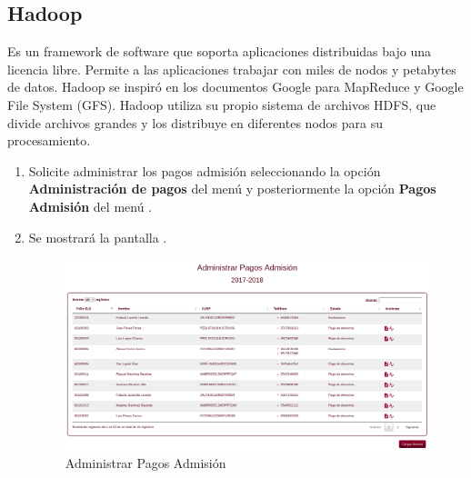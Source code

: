 \subsection{Hadoop}
Es un framework de software que soporta aplicaciones distribuidas bajo una licencia libre. Permite a las aplicaciones trabajar con miles de nodos y petabytes de datos. Hadoop se inspiró en los documentos Google para MapReduce y Google File System (GFS). Hadoop utiliza su propio sistema de archivos HDFS, que divide archivos grandes y los distribuye en diferentes nodos para su procesamiento.
\begin{enumerate}
	\item Solicite administrar los pagos admisión seleccionando la opción \textbf{Administración de pagos} del menú  y posteriormente la opción \textbf{Pagos Admisión} del menú .
	\item Se mostrará la pantalla .
	\begin{figure}[!htbp]
		\hypertarget{fig:APA}{\hspace{1pt}}
		\begin{center}
			\includegraphics[height=0.3\textheight]{capitulo1/images/IU-APA.png}
			\caption{Administrar Pagos Admisión}
			\label{fig:APA}
		\end{center}
	\end{figure}

	
\end{enumerate}
